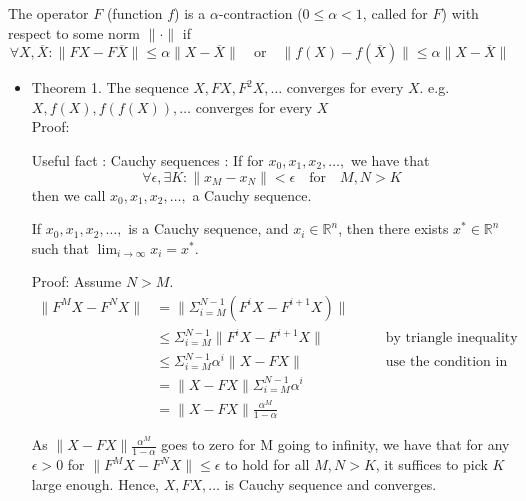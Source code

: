 \documentclass[9pt]{article}
\begin{document}
\Working


 \Working

  The operator $F$ (function $f$) is a $\alpha$-contraction  ($0\le\alpha<1$, called  for $F$) with respect to some norm $\|\cdot\|$ if
\begin{displaymath}
  \forall X,\overline{X}: \|FX-F\overline{X}\| \le \alpha \|X-\overline{X}\| \quad \text{or} \quad \|f(X)-f(\overline{X})\| \le \alpha \|X-\overline{X}\|
\end{displaymath}

\begin{itemize}
\item Theorem 1. The sequence $X, FX, F^2X, \ldots$ converges for every $X$.  e.g. $X, f(X), f(f(X)), \ldots$ converges for every $X$\\

Proof:

Useful fact : Cauchy sequences : If for $x_0,x_1,x_2,\ldots,$ we have that
\begin{displaymath}
  \forall \epsilon, \exists K : \|x_M-x_N \| < \epsilon \quad \text{for} \quad M,N > K
\end{displaymath}
then we call $x_0,x_1,x_2,\ldots,$ a Cauchy sequence.

If $x_0,x_1,x_2,\ldots,$ is a Cauchy sequence, and $x_i \in \mathbb{R}^n$, then there exists $x^* \in \mathbb{R}^n$ such that $\lim_{i \to \infty}x_i = x^*$.

Proof:
Assume $N > M$.
\begin{displaymath}
  \begin{alignedat}{2} %
  \| F^MX-F^NX \| & = \| \Sigma_{i=M}^{N-1}(F^iX-F^{i+1}X)\| & &\\
  & \le \Sigma_{i=M}^{N-1} \| F^iX-F^{i+1}X \|  & &\quad \text{by triangle inequality}\\
  & \le \Sigma_{i=M}^{N-1} \alpha ^{i} \| X-FX\|  & &\quad \text{use the condition in Theorem}\\
  & = \| X-FX \| \Sigma_{i=M}^{N-1}\alpha^i & &\\
  & = \| X-FX \| \frac{\alpha^M}{1-\alpha} & &
  \end{alignedat}
\end{displaymath}

As $\| X-FX \| \frac{\alpha^M}{1-\alpha}$ goes to zero for M going to infinity, we have that for any $\epsilon > 0$ for $\|F^MX-F^NX\| \le \epsilon$ to hold for all $M,N>K$, it suffices to pick $K$ large enough. Hence, $X,FX,\ldots$ is Cauchy sequence and converges.


\end{itemize}
\end{document}
